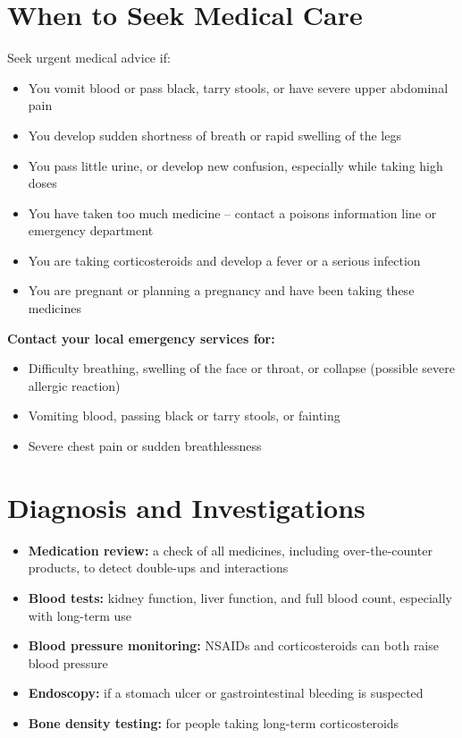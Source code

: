 \section*{When to Seek Medical Care}
Seek urgent medical advice if:

\begin{itemize}
    \item You vomit blood or pass black, tarry stools, or have severe upper abdominal pain
    \item You develop sudden shortness of breath or rapid swelling of the legs
    \item You pass little urine, or develop new confusion, especially while taking high doses
    \item You have taken too much medicine -- contact a poisons information line or emergency department
    \item You are taking corticosteroids and develop a fever or a serious infection
    \item You are pregnant or planning a pregnancy and have been taking these medicines
\end{itemize}

\textbf{Contact your local emergency services for:}
\begin{itemize}
    \item Difficulty breathing, swelling of the face or throat, or collapse (possible severe allergic reaction)
    \item Vomiting blood, passing black or tarry stools, or fainting
    \item Severe chest pain or sudden breathlessness
\end{itemize}

\section*{Diagnosis and Investigations}
\begin{itemize}
    \item \textbf{Medication review:} a check of all medicines, including over-the-counter products, to detect double-ups and interactions
    \item \textbf{Blood tests:} kidney function, liver function, and full blood count, especially with long-term use
    \item \textbf{Blood pressure monitoring:} NSAIDs and corticosteroids can both raise blood pressure
    \item \textbf{Endoscopy:} if a stomach ulcer or gastrointestinal bleeding is suspected
    \item \textbf{Bone density testing:} for people taking long-term corticosteroids
\end{itemize}

